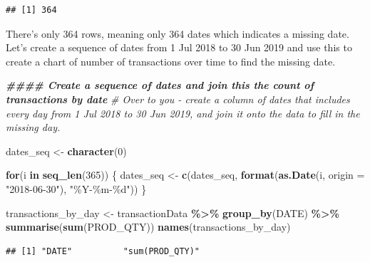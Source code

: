 \documentclass[
]{article}
\newenvironment{Shaded}{\begin{snugshade}}{\end{snugshade}}
\newcommand{\AttributeTok}[1]{\textcolor[rgb]{0.13,0.29,0.53}{#1}}
\newcommand{\CommentTok}[1]{\textcolor[rgb]{0.56,0.35,0.01}{\textit{#1}}}
\newcommand{\ControlFlowTok}[1]{\textcolor[rgb]{0.13,0.29,0.53}{\textbf{#1}}}
\newcommand{\DecValTok}[1]{\textcolor[rgb]{0.00,0.00,0.81}{#1}}
\newcommand{\DocumentationTok}[1]{\textcolor[rgb]{0.56,0.35,0.01}{\textbf{\textit{#1}}}}
\newcommand{\FunctionTok}[1]{\textcolor[rgb]{0.13,0.29,0.53}{\textbf{#1}}}
\newcommand{\NormalTok}[1]{#1}
\newcommand{\OtherTok}[1]{\textcolor[rgb]{0.56,0.35,0.01}{#1}}
\newcommand{\SpecialCharTok}[1]{\textcolor[rgb]{0.81,0.36,0.00}{\textbf{#1}}}
\newcommand{\StringTok}[1]{\textcolor[rgb]{0.31,0.60,0.02}{#1}}
\begin{document}
\begin{verbatim}
## [1] 364
\end{verbatim}

There's only 364 rows, meaning only 364 dates which indicates a missing
date. Let's create a sequence of dates from 1 Jul 2018 to 30 Jun 2019
and use this to create a chart of number of transactions over time to
find the missing date.

\begin{Shaded}
\begin{Highlighting}[]
\DocumentationTok{\#\#\#\# Create a sequence of dates and join this the count of transactions by date}
\CommentTok{\# Over to you {-} create a column of dates that includes every day from 1 Jul 2018 to 30 Jun 2019, and join it onto the data to fill in the missing day.}

\NormalTok{dates\_seq }\OtherTok{\textless{}{-}} \FunctionTok{character}\NormalTok{(}\DecValTok{0}\NormalTok{)}

\ControlFlowTok{for}\NormalTok{(i }\ControlFlowTok{in} \FunctionTok{seq\_len}\NormalTok{(}\DecValTok{365}\NormalTok{))}
\NormalTok{\{}
\NormalTok{  dates\_seq }\OtherTok{\textless{}{-}} \FunctionTok{c}\NormalTok{(dates\_seq, }\FunctionTok{format}\NormalTok{(}\FunctionTok{as.Date}\NormalTok{(i, }\AttributeTok{origin =} \StringTok{"2018{-}06{-}30"}\NormalTok{), }\StringTok{"\%Y{-}\%m{-}\%d"}\NormalTok{))}
\NormalTok{\}}

\NormalTok{transactions\_by\_day }\OtherTok{\textless{}{-}}\NormalTok{ transactionData }\SpecialCharTok{\%\textgreater{}\%} \FunctionTok{group\_by}\NormalTok{(DATE) }\SpecialCharTok{\%\textgreater{}\%} \FunctionTok{summarise}\NormalTok{(}\FunctionTok{sum}\NormalTok{(PROD\_QTY))}
\FunctionTok{names}\NormalTok{(transactions\_by\_day)}
\end{Highlighting}
\end{Shaded}

\begin{verbatim}
## [1] "DATE"          "sum(PROD_QTY)"
\end{verbatim}
\end{document}
